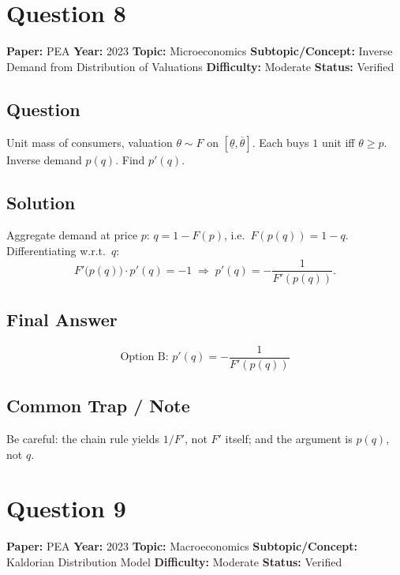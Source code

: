 \documentclass[11pt]{article}
\begin{document}
\medskip

\section*{Question 8}
\textbf{Paper:} PEA \quad \textbf{Year:} 2023 \quad \textbf{Topic:} Microeconomics \quad \textbf{Subtopic/Concept:} Inverse Demand from Distribution of Valuations \quad \textbf{Difficulty:} Moderate \quad \textbf{Status:} Verified

\subsection*{Question}
Unit mass of consumers, valuation $\theta\sim F$ on $[\underline\theta,\overline\theta]$. Each buys $1$ unit iff $\theta\ge p$. Inverse demand $p(q)$. Find $p'(q)$.

\subsection*{Solution}
Aggregate demand at price $p$: $q=1-F(p)$, i.e.\ $F(p(q))=1-q$. Differentiating w.r.t.\ $q$:
\[
F'\bigl(p(q)\bigr)\cdot p'(q)=-1 \;\Longrightarrow\; p'(q)=-\frac{1}{F'(p(q))}.
\]

\subsection*{Final Answer}
\[
\boxed{\text{Option B: } p'(q)=-\dfrac{1}{F'(p(q))}}
\]

\subsection*{Common Trap / Note}
Be careful: the chain rule yields $1/F'$, not $F'$ itself; and the argument is $p(q)$, not $q$.

\medskip

\section*{Question 9}
\textbf{Paper:} PEA \quad \textbf{Year:} 2023 \quad \textbf{Topic:} Macroeconomics \quad \textbf{Subtopic/Concept:} Kaldorian Distribution Model \quad \textbf{Difficulty:} Moderate \quad \textbf{Status:} Verified
\end{document}
